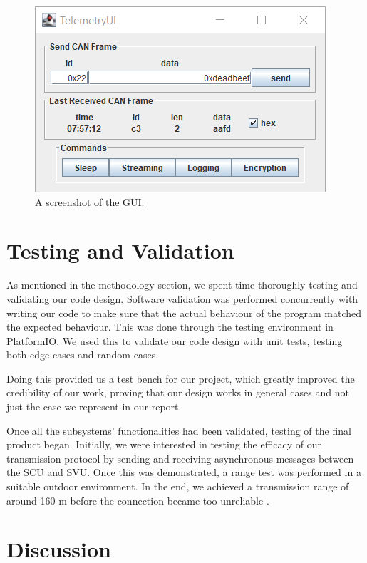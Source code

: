 \documentclass[a4paper,conference]{IEEEtran}
\begin{document}
\begin{figure}[b]
    \centering
    \includegraphics[width=\linewidth]{documentation/images/swing.png}
    \caption{A screenshot of the GUI.}
    \label{fig:gui_screenshot}
\end{figure}


\section{Testing and Validation} %
As mentioned in the methodology section, we spent time thoroughly testing and validating our code design. Software validation was performed concurrently with writing our code to make sure that the actual behaviour of the program matched the expected behaviour. This was done through the testing environment in PlatformIO. We used this to validate our code design with unit tests, testing both edge cases and random cases.

Doing this provided us a test bench for our project, which greatly improved the credibility of our work, proving that our design works in general cases and not just the case we represent in our report.

Once all the subsystems' functionalities had been validated, testing of the final product began. Initially, we were interested in testing the efficacy of our transmission protocol by sending and receiving asynchronous messages between the SCU and SVU. Once this was demonstrated, a range test was performed in a suitable outdoor environment. In the end, we achieved a transmission range of around 160 m before the connection became too unreliable \cite{rangeTest}. 

\section{Discussion}
\end{document}
